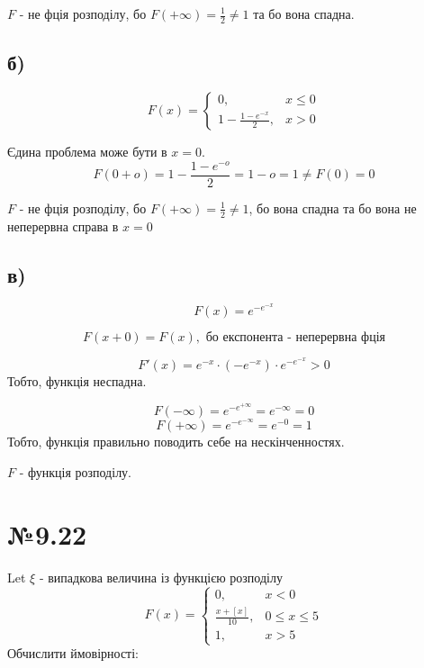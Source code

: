 \documentclass[11pt, a4paper]{article} %
\begin{document}
\begin{mdframed}[backgroundcolor=red!25]
    $F$ - не фція розподілу, бо $F(+\infty) = \frac{1}{2} \ne 1 $
    та бо вона спадна.
\end{mdframed}

\subsection*{б)}
\begin{mdframed}
    $$F(x) = \begin{cases}
        0,& x\le0\\
        1-\frac{1-e^{-x}}{2},& x > 0
    \end{cases}$$
\end{mdframed}

Єдина проблема може бути в $x=0$.
$$F(0+o) = 1-\frac{1-e^{-o}}{2} = 1-o = 1 \ne F(0) = 0$$

\begin{mdframed}[backgroundcolor=red!25]
    $F$ - не фція розподілу, бо $F(+\infty) = \frac{1}{2} \ne 1 $, 
    бо вона спадна та бо вона не неперервна справа в $x=0$
\end{mdframed}

\subsection*{в)}
\begin{mdframed}
    $$F(x) = e^{-e^{-x}}$$
\end{mdframed}

$$F(x+0) = F(x), \text{ бо експонента - неперервна фція}$$

$$F'(x) = e^{-x} \cdot (-e^{-x}) \cdot e^{-e^{-x}} > 0$$
Тобто, функція неспадна.

$$F(-\infty) = e^{-e^{+\infty}} = e^{-\infty} = 0$$
$$F(+\infty) = e^{-e^{-\infty}} = e^{-0} = 1$$
Тобто, функція правильно поводить себе на нескінченностях.

\begin{mdframed}[backgroundcolor=green!25]
    $F$ - функція розподілу.
\end{mdframed}

\section*{№9.22}
\begin{mdframed}
    Let $\xi$ - випадкова величина із функцією розподілу
    $$F(x) = \begin{cases} 
        0, & x<0 \\
        \displaystyle\frac{x+[x]}{10},& 0\le x\le 5\\
        1,& x>5
    \end{cases}$$
    Обчислити ймовірності:
\end{mdframed}
\end{document}
